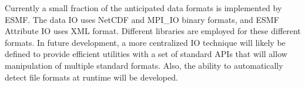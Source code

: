 
Currently a small fraction of the anticipated data formats is implemented by 
ESMF.  The data IO uses NetCDF and MPI\_IO binary formats, and ESMF Attribute
IO uses XML format.  Different libraries are employed for these 
different formats.  In future development, a more centralized IO technique
will likely be defined to provide efficient utilities with a set of standard
APIs that will allow manipulation of multiple standard formats.  Also, the 
ability to automatically detect file formats at runtime will be developed.
